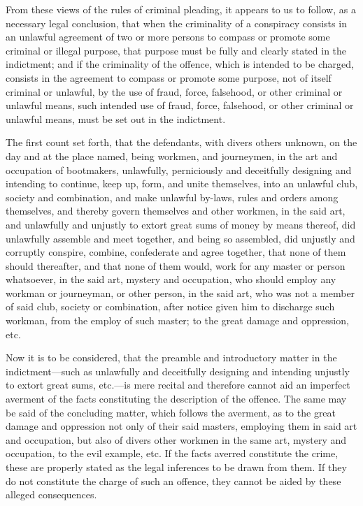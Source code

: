 \documentclass[
  letterpaper,
  11pt,
  DIV=9,
  openright]{scrbook}
\begin{document}
From these views of the rules of criminal pleading, it appears to us to
follow, as a necessary legal conclusion, that when the criminality of a
conspiracy consists in an unlawful agreement of two or more persons to
compass or promote some criminal or illegal purpose, that purpose must
be fully and clearly stated in the indictment; and if the criminality of
the offence, which is intended to be charged, consists in the agreement
to compass or promote some purpose, not of itself criminal or unlawful,
by the use of fraud, force, falsehood, or other criminal or unlawful
means, such intended use of fraud, force, falsehood, or other criminal
or unlawful means, must be set out in the indictment.

The first count set forth, that the defendants, with divers others
unknown, on the day and at the place named, being workmen, and
journeymen, in the art and occupation of bootmakers, unlawfully,
perniciously and deceitfully designing and intending to continue, keep
up, form, and unite themselves, into an unlawful club, society and
combination, and make unlawful by-laws, rules and orders among
themselves, and thereby govern themselves and other workmen, in the said
art, and unlawfully and unjustly to extort great sums of money by means
thereof, did unlawfully assemble and meet together, and being so
assembled, did unjustly and corruptly conspire, combine, confederate and
agree together, that none of them should thereafter, and that none of
them would, work for any master or person whatsoever, in the said art,
mystery and occupation, who should employ any workman or journeyman, or
other person, in the said art, who was not a member of said club,
society or combination, after notice given him to discharge such
workman, from the employ of such master; to the great damage and
oppression, etc.

Now it is to be considered, that the preamble and introductory matter in
the indictment---such as unlawfully and deceitfully designing and
intending unjustly to extort great sums, etc.---is mere recital and
therefore cannot aid an imperfect averment of the facts constituting the
description of the offence. The same may be said of the concluding
matter, which follows the averment, as to the great damage and
oppression not only of their said masters, employing them in said art
and occupation, but also of divers other workmen in the same art,
mystery and occupation, to the evil example, etc. If the facts averred
constitute the crime, these are properly stated as the legal inferences
to be drawn from them. If they do not constitute the charge of such an
offence, they cannot be aided by these alleged consequences.
\end{document}

